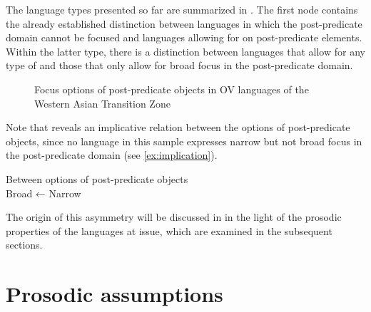\documentclass[output=paper,colorlinks,citecolor=brown]{langscibook}
\begin{document}
The language types presented so far are summarized in . The first node contains the already established distinction between languages in which the post-predicate domain cannot be focused and languages allowing for  on post-predicate elements. Within the latter type, there is a distinction between languages that allow for any type of  and those that only allow for broad focus in the post-predicate domain.

\begin{figure}
\caption{Focus options of post-predicate objects in OV languages of the Western Asian Transition Zone}
    \label{fig:treeIS}
\end{figure}

Note that  reveals an implicative relation between the  options of post-predicate objects, since no language in this sample expresses narrow but not broad focus in the post-predicate domain (see \ref{ex:implication}).

\ea \label{ex:implication}
    Between  options of post-predicate objects\\
    Broad  ← Narrow \\
\z

The origin of this asymmetry will be discussed in  in the light of the prosodic properties of the languages at issue, which are examined in the subsequent sections.

\section{Prosodic assumptions} \label{sec:assumptions}
\end{document}
